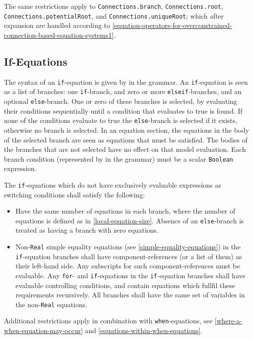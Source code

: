 The same restrictions apply to \lstinline!Connections.branch!, \lstinline!Connections.root!, \lstinline!Connections.potentialRoot!, and \lstinline!Connections.uniqueRoot!; which after expansion are handled according to \cref{equation-operators-for-overconstrained-connection-based-equation-systems1}.


\subsection{If-Equations}\label{if-equations}

The syntax of an \lstinline!if!-equation is given by  in the grammar.
An \lstinline!if!-equation is seen as a list of branches: one \lstinline!if!-branch, and zero or more \lstinline!elseif!-branches, and an optional \lstinline!else!-branch.
One or zero of these branches is selected, by evaluating their conditions sequentially until a condition that evaluates to true is found.
If none of the conditions evaluate to true the \lstinline!else!-branch is selected if it exists, otherwise no branch is selected.
In an equation section, the equations in the body of the selected branch are seen as equations that must be satisfied.
The bodies of the branches that are not selected have no effect on that model evaluation.
Each branch condition (represented by  in the grammar) must be a scalar \lstinline!Boolean! expression.

The \lstinline!if!-equations which do not have exclusively evaluable expressions as switching conditions shall satisfy the following:
\begin{itemize}
\item
  Have the same number of equations in each branch, where the number of equations is defined as in \cref{local-equation-size}.
  Absence of an \lstinline!else!-branch is treated as having a branch with zero equations.
\item
  Non-\lstinline!Real! simple equality equations (see \cref{simple-equality-equations}) in the \lstinline!if!-equation branches shall have component-references (or a list of them) as their left-hand side.
  Any subscripts for such component-references must be evaluable.
  Any \lstinline!for!- and \lstinline!if!-equations in the \lstinline!if!-equation branches shall have evaluable controlling conditions, and contain equations which fullfil these requirements recursively.
  All branches shall have the same set of variables in the non-\lstinline!Real! equations.
\end{itemize}
Additional restrictions apply in combination with \lstinline!when!-equations, see \cref{where-a-when-equation-may-occur} and \cref{equations-within-when-equations}.

